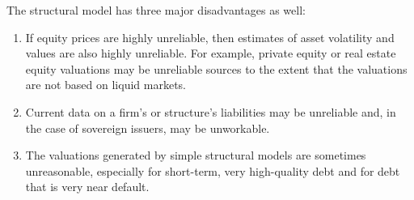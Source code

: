 \documentclass[11pt]{article}
\begin{document}
The structural model has three major disadvantages as well:

\begin{enumerate}
  \item If equity prices are highly unreliable, then estimates of asset volatility and values are also highly unreliable. For example, private equity or real estate equity valuations may be unreliable sources to the extent that the valuations are not based on liquid markets.

  \item Current data on a firm's or structure's liabilities may be unreliable and, in the case of sovereign issuers, may be unworkable.

  \item The valuations generated by simple structural models are sometimes unreasonable, especially for short-term, very high-quality debt and for debt that is very near default.

\end{enumerate}
\end{document}
